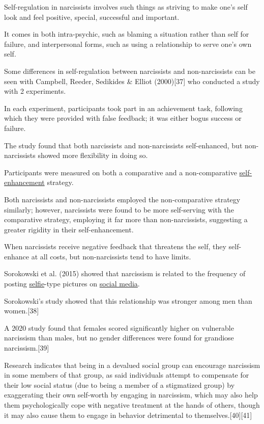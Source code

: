 \documentclass[oneside]{book}
\numberwithin{equation}{section}
\begin{document}
Self-regulation in narcissists involves such things as striving to make one's self look and feel positive, special, successful and important.

It comes in both intra-psychic, such as blaming a situation rather than self for failure, and interpersonal forms, such as using a relationship to serve one's own self.

Some differences in self-regulation between narcissists and non-narcissists can be seen with Campbell, Reeder, Sedikides \& Elliot (2000)[37] who conducted a study with 2 experiments.

In each experiment, participants took part in an achievement task, following which they were provided with false feedback; it was either bogus success or failure.

The study found that both narcissists and non-narcissists self-enhanced, but non-narcissists showed more flexibility in doing so.

Participants were measured on both a comparative and a non-comparative \href{https://en.wikipedia.org/wiki/Self-enhancement}{self-enhancement} strategy.

Both narcissists and non-narcissists employed the non-comparative strategy similarly; however, narcissists were found to be more self-serving with the comparative strategy, employing it far more than non-narcissists, suggesting a greater rigidity in their self-enhancement.

When narcissists receive negative feedback that threatens the self, they self-enhance at all costs, but non-narcissists tend to have limits.

%
Sorokowski et al. (2015) showed that narcissism is related to the frequency of posting \href{https://en.wikipedia.org/wiki/Selfie}{selfie}-type pictures on \href{https://en.wikipedia.org/wiki/Social_media}{social media}.

Sorokowski's study showed that this relationship was stronger among men than women.[38]

%
A 2020 study found that females scored significantly higher on vulnerable narcissism than males, but no gender differences were found for grandiose narcissism.[39]

%
Research indicates that being in a devalued social group can encourage narcissism in some members of that group, as said individuals attempt to compensate for their low social status (due to being a member of a stigmatized group) by exaggerating their own self-worth by engaging in narcissism, which may also help them psychologically cope with negative treatment at the hands of others, though it may also cause them to engage in behavior detrimental to themselves.[40][41]
\end{document}
